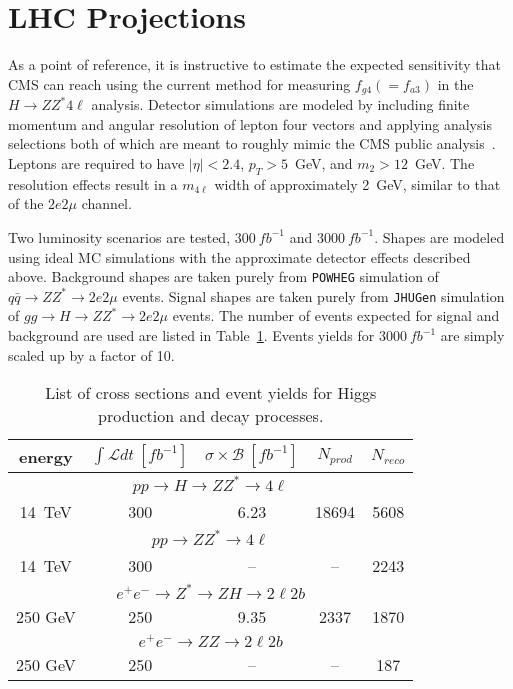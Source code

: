 \section{LHC Projections}

As a point of reference, it is instructive to estimate the
expected sensitivity that CMS can reach using the current method
for measuring $f_{g4} (=f_{a3})$ in the $H\to ZZ^*4\ell$ analysis.  Detector
simulations are modeled by 
including finite momentum and angular resolution of lepton
four vectors and applying analysis selections both of which are
meant to roughly mimic the CMS public analysis~\cite{CMS:xwa}.
Leptons are
required to have $|\eta|<2.4$, $p_T>5$~GeV, and $m_2>12$~GeV.
The resolution effects result in a $m_{4\ell}$ width of
approximately 2~GeV, similar to that of the $2e2\mu$ channel.  

Two luminosity scenarios are tested, $300~fb^{-1}$ and 
$3000~fb^{-1}$.  Shapes are modeled using ideal MC simulations
with the approximate detector effects described above.
Background shapes are taken purely from \verb+POWHEG+ simulation
of $q\bar{q}\to ZZ^*\to 2e2\mu$ events.  Signal shapes are
taken purely from \verb+JHUGen+ simulation of 
$gg\to H\to ZZ^*\to 2e2\mu$ events.  
The number of events expected for signal and background are 
used are listed in Table~\ref{table:FutureMeasEventYields}.
Events yields for $3000~fb^{-1}$ are simply scaled up by 
a factor of 10. 

\begin{table}
\begin{center}
\begin{tabular}{ccccc}
\hline 
\hline
energy & $\int \mathscr{L}dt~[fb^{-1}]$ & 
$\sigma\times\mathscr{B}~[fb^{-1}]$ & $N_{prod}$ & $N_{reco}$ \\ 
\hline
\hline
\multicolumn{5}{c}{$pp\to H \to ZZ^* \to 4\ell$}  \\
\hline
14~TeV & 300  &  6.23 & 18694 & 5608 \\
\hline
\multicolumn{5}{c}{$pp\to ZZ^* \to 4\ell$}  \\
\hline
14~TeV & 300 &  -- & -- & 2243 \\
\hline
\multicolumn{5}{c}{$e^+e^-\to Z^* \to ZH \to 2\ell 2b$} \\
\hline
250 GeV & 250 & 9.35 & 2337 & 1870 \\
\hline
\multicolumn{5}{c}{$e^+e^-\to ZZ \to 2\ell 2b$} \\
\hline
250 GeV & 250 & -- & -- & 187 \\
\hline
\hline
\end{tabular}
\end{center}
\label{table:FutureMeasEventYields}
\caption{List of cross sections and event yields for Higgs
production and decay processes.}
\end{table}

